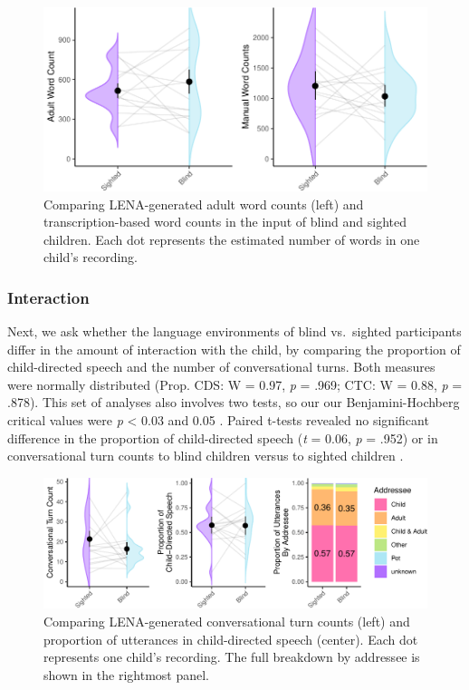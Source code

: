 \documentclass[
  man]{apa6}
\begin{document}
\begin{figure}
\centering
\includegraphics{input_quality_manuscript_files/figure-latex/quantity-plots-1.pdf}
\caption{\label{fig:quantity-plots}Comparing LENA-generated adult word counts (left) and transcription-based word counts in the input of blind and sighted children. Each dot represents the estimated number of words in one child's recording.}
\end{figure}

\hypertarget{interaction-1}{%
\subsubsection{Interaction}\label{interaction-1}}

Next, we ask whether the language environments of blind vs.~sighted participants differ in the amount of interaction with the child, by comparing the proportion of child-directed speech and the number of conversational turns. Both measures were normally distributed (Prop. CDS: W = 0.97, \emph{p} = .969; CTC: W = 0.88, \emph{p} = .878). This set of analyses also involves two tests, so our our Benjamini-Hochberg critical values were \emph{p} \textless{} 0.03 and 0.05 . Paired t-tests revealed no significant difference in the proportion of child-directed speech (\emph{t} = 0.06, \emph{p} = .952) or in conversational turn counts to blind children versus to sighted children .

\begin{figure}
\centering
\includegraphics{input_quality_manuscript_files/figure-latex/interaction-plots-1.pdf}
\caption{\label{fig:interaction-plots}Comparing LENA-generated conversational turn counts (left) and proportion of utterances in child-directed speech (center). Each dot represents one child's recording. The full breakdown by addressee is shown in the rightmost panel.}
\end{figure}
\end{document}
